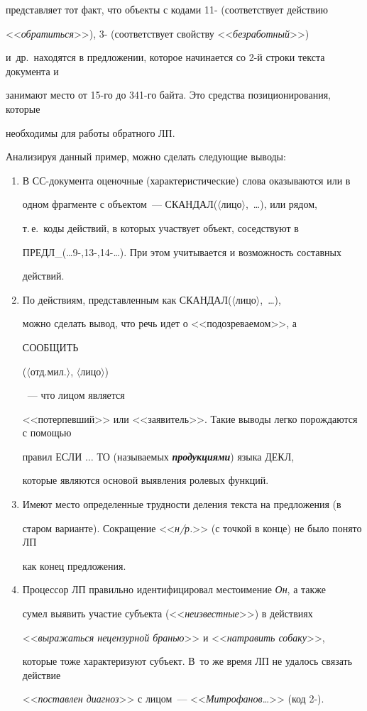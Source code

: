 представляет тот факт, что объекты с кодами 11- (соответствует действию 


<<\textit{обратиться}>>), 3- (соответствует свойству <<\textit{безработный}>>) 


и~др.\ находятся в предложении, которое начинается со 2-й строки текста документа и 


занимают место от 15-го  до 341-го байта. Это средства позиционирования, которые 


необходимы для работы обратного ЛП. 


   


    Анализируя данный пример, можно сделать следующие выводы:


   \begin{enumerate}


   \item  В СС-документа оценочные (характеристические) слова оказываются или в 


одном фрагменте с объектом~--- {\sf СКАНДАЛ($\langle$лицо$\rangle$,\ \ldots)}, или рядом, 


т.\,е.\ коды действий, в которых участвует объект, соседствуют в 


   {\sf ПРЕДЛ\_(\ldots \mbox{9-,13-,14-}\ldots)}. При этом учитывается и возможность составных 


действий.


   \item По действиям, представленным как {\sf СКАНДАЛ($\langle$лицо$\rangle$,\ \ldots)}, 


можно сделать вывод, что речь идет о <<подозреваемом>>, а {\sf СООБЩИТЬ 


($\langle$отд.мил.$\rangle$, $\langle$лицо$\rangle$)}~--- что лицом является 


<<потерпевший>> или <<заявитель>>. Такие выводы легко порождаются с помощью 


правил ЕСЛИ $\ldots$ ТО (называемых {\bfseries\textit{продукциями}}) языка ДЕКЛ, 


которые являются основой выявления ролевых функций.      


   \item Имеют место определенные трудности деления текста на предложения (в 


старом варианте). Сокращение <<\textit{н/р.}>> (с точкой в конце) не было понято ЛП 


как конец предложения. 


   \item Процессор ЛП правильно идентифицировал местоимение \textit{Он}, а также 


сумел выявить участие субъекта (<<\textit{неизвестные}>>) в действиях 


<<\textit{выражаться нецензурной бранью}>> и  <<\textit{натравить собаку}>>, 


которые тоже характеризуют субъект. В~то же время ЛП не удалось связать действие 


<<\textit{поставлен диагноз}>> с лицом~--- <<\textit{Митрофанов}\ldots>> (код 2-).


   \end{enumerate}


